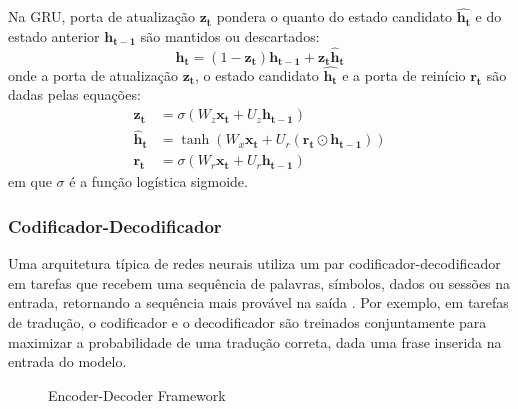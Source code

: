 Na GRU, porta de atualização $\mathbf{z_t}$ pondera o quanto do
estado candidato $\mathbf{\hat{h_t}}$ e do estado anterior $\mathbf{h_{t-1}}$
são mantidos ou descartados:
\begin{equation}
    \mathbf{h_t} = (1 - \mathbf{z_t})\mathbf{h_{t-1}} + \mathbf{z_t}\mathbf{\hat{h}_t}
\end{equation}
onde a porta de atualização $\mathbf{z_t}$, o estado candidato $\mathbf{\hat{h_t}}$
e a porta de reinício $\mathbf{r_t}$ são dadas pelas equações:
\begin{align}
    \mathbf{z_t} &= \sigma(W_z\mathbf{x_t} + U_z\mathbf{h_{t-1}}) \\
    \mathbf{\hat{h}_t} &= \tanh(W_x\mathbf{x_t} + U_r(\mathbf{r_t} \odot \mathbf{h_{t-1}})) \\
    \mathbf{r_t} &= \sigma(W_r\mathbf{x_t} + U_r\mathbf{h_{t-1}})
\end{align}
em que $\sigma$ é a função logística sigmoide.

\subsubsection{Codificador-Decodificador}
Uma arquitetura típica de redes neurais utiliza um par codificador-decodificador
em tarefas que recebem uma sequência de palavras, símbolos, dados ou sessões na
entrada, retornando a sequência mais provável na saída
\cite{bahdanau2016neural}. Por exemplo, em tarefas de tradução, o codificador e
o decodificador são treinados conjuntamente para maximizar a probabilidade de
uma tradução correta, dada uma frase inserida na entrada do modelo.

\begin{figure}
    \centering
    \caption{Encoder-Decoder Framework}
\end{figure}

